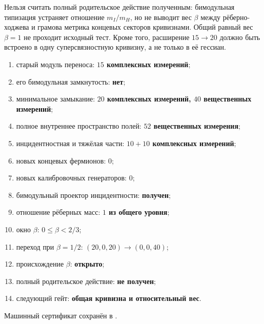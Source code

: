 \begin{nogocriterion}
Нельзя считать полный родительское действие полученным: бимодульная типизация
устраняет отношение $m_I/m_H$, но не выводит вес $\beta$ между рёберно-ходжева и
грамова метрика концевых секторов кривизнами. Общий равный вес $\beta=1$ не проходит исходный
тест. Кроме того, расширение $15\to20$ должно быть встроено в одну
суперсвязностную кривизну, а не только в её гессиан.
\end{nogocriterion}

\begin{protocol}
\begin{enumerate}
 \item старый модуль переноса: \textbf{$15$ комплексных измерений};
 \item его бимодульная замкнутость: \textbf{нет};
 \item минимальное замыкание: \textbf{$20$ комплексных измерений, $40$ вещественных измерений};
 \item полное внутреннее пространство полей: \textbf{$52$ вещественных измерения};
 \item инцидентностная и тяжёлая части: \textbf{$10+10$ комплексных измерений};
 \item новых концевых фермионов: \textbf{$0$};
 \item новых калибровочных генераторов: \textbf{$0$};
 \item бимодульный проектор инцидентности: \textbf{получен};
 \item отношение рёберных масс: \textbf{$1$ из общего уровня};
 \item окно $\beta$: \textbf{$0\leq\beta<2/3$};
 \item переход при $\beta=1/2$: \textbf{$(20,0,20)\to(0,0,40)$};
 \item происхождение $\beta$: \textbf{открыто};
 \item полный родительское действие: \textbf{не получен};
 \item следующий гейт: \textbf{общая кривизна и относительный вес}.
\end{enumerate}
\end{protocol}

Машинный сертификат сохранён в
.